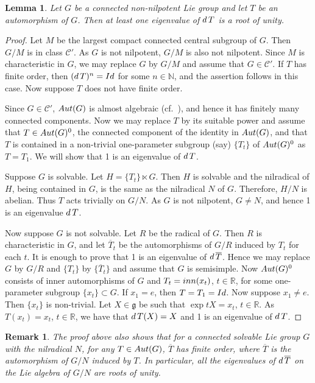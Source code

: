 \documentclass{amsart}
\numberwithin{equation}{section}
\newcommand{\Aut}{{\rm Aut}}
\newcommand{\N}{{\mathbb N}}
\newcommand{\R}{{\mathbb R}}
\newcommand{\gf}{{\mathfrak g}}
\newcommand{\du}{{\rm d\,}}
\newcommand{\Id}{{\rm Id}}
\newcommand{\inn}{{\rm inn}}
\let\ol=\overline
\newtheorem{lem}[thm]{Lemma}
\newtheorem{rem}[thm]{Remark}
\theoremstyle{remark}
\newcommand{\cp}{{\mathcal{C}'}}
\begin{document}
\begin{lem} \label{eigen}
Let $G$ be a connected non-nilpotent Lie group and let $T$ be an automorphism of $G$. Then 
at least one eigenvalue of $\du T$ is a root of unity.
\end{lem}

 \begin{proof}
Let $M$ be the largest compact connected central subgroup of $G$. 
 Then $G/M$ is in class $\cp$. As $G$ is not nilpotent, $G/M$ is also not nilpotent. 
 Since $M$ is characteristic in $G$, we may replace $G$ by $G/M$ and assume that $G\in\cp$. 
 If $T$ has finite order, then $(\du T)^n=\Id$ for some $n\in\N$, and the assertion follows in this case. 
 Now suppose $T$ does not have finite order. 
 
 Since $G\in\cp$,  $\Aut(G)$ is almost algebraic (cf.\ \cite{D}), and 
 hence it has finitely many connected components. Now we may replace $T$ by its suitable 
 power and assume that $T\in\Aut(G)^0$, the connected component of the identity 
 in $\Aut(G)$, and that $T$ is contained in a non-trivial one-parameter subgroup (say) $\{T_t\}$
 of $\Aut(G)^0$ as $T=T_1$. We will show that 1 is an eigenvalue of $\du T$. 
 
 Suppose $G$ is solvable. Let $H=\{T_t\}\ltimes G$.  Then $H$ is solvable 
 and the nilradical of $H$, being contained in $G$, is the same as the nilradical $N$ of $G$. 
 Therefore, $H/N$ is abelian. Thus $T$ acts trivially on $G/N$. As $G$ is not nilpotent, $G\ne N$, 
 and hence 1 is an eigenvalue $\du T$. 
 
 Now suppose $G$ is not solvable. Let $R$ be the radical of $G$. Then $R$ is characteristic in $G$, and let 
 $\ol{T}_t$ be the automorphisms of $G/R$ induced by $T_t$ for each $t$. It is enough to prove that 1 is an 
 eigenvalue of $\du \ol{T}$. Hence we may replace $G$ by $G/R$ and $\{T_t\}$ by $\{\ol{T}_t\}$ 
 and assume that $G$ is semisimple.  Now $\Aut(G)^0$ consists of inner automorphisms of $G$ and
 $T_t=\inn(x_t)$, $t\in\R$, for some one-parameter subgroup $\{x_t\}\subset G$. 
 If $x_1=e$, then $T=T_1=\Id$. Now suppose $x_1\ne e$. Then $\{x_t\}$ is non-trivial.
 Let $X\in \gf$ be such that $\exp tX=x_t$, $t\in \R$. As $T(x_t)=x_t$, $t\in\R$, 
 we have that $\du T(X)=X$ and 1 is an eigenvalue of $\du T$. 
 \end{proof}

\begin{rem} \label{eigen-rem} The proof above also shows that for a connected solvable Lie group $G$ with 
the nilradical $N$, for any $T\in \Aut(G)$, $\ol{T}$ has finite order, where $\ol{T}$ is the automorphism of 
$G/N$ induced by $T$. In particular, all the eigenvalues of $\du\ol{T}$ on the Lie algebra of $G/N$ 
are roots of unity. 
\end{rem}
\end{document}
